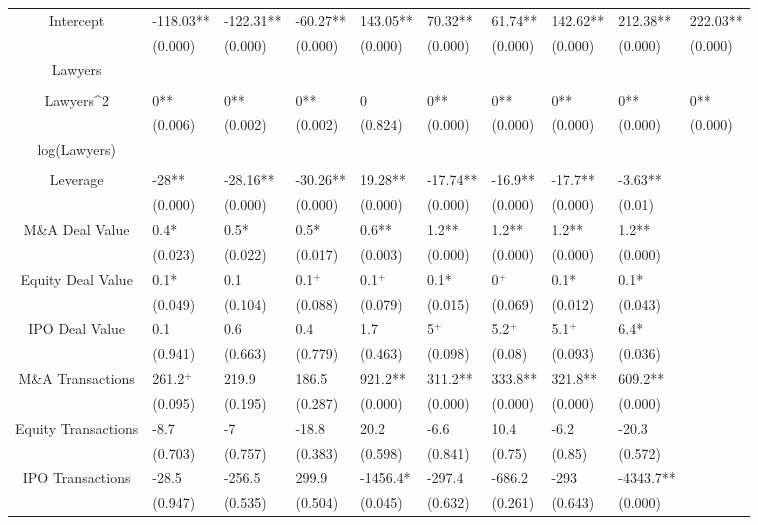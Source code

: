 \documentclass{article}
\begin{document}
\begin{table}[H]
\begin{tabular}{|clllllllll|}
Intercept & -118.03** & -122.31** & -60.27** & 143.05** & 70.32** & 61.74** & 142.62** & 212.38** & 222.03** \\
   & (0.000) & (0.000) & (0.000) & (0.000) & (0.000) & (0.000) & (0.000) & (0.000) & (0.000) \\
  Lawyers &  &  &  &  &  &  &  &  &  \\
   &  &  &  &  &  &  &  &  &  \\
  Lawyers^2 & 0** & 0** & 0** & 0 & 0** & 0** & 0** & 0** & 0** \\
   & (0.006) & (0.002) & (0.002) & (0.824) & (0.000) & (0.000) & (0.000) & (0.000) & (0.000) \\
  log(Lawyers) &  &  &  &  &  &  &  &  &  \\
   &  &  &  &  &  &  &  &  &  \\
  Leverage & -28** & -28.16** & -30.26** & 19.28** & -17.74** & -16.9** & -17.7** & -3.63** &  \\
   & (0.000) & (0.000) & (0.000) & (0.000) & (0.000) & (0.000) & (0.000) & (0.01) &  \\
  M\&A Deal Value & 0.4* & 0.5* & 0.5* & 0.6** & 1.2** & 1.2** & 1.2** & 1.2** &  \\
   & (0.023) & (0.022) & (0.017) & (0.003) & (0.000) & (0.000) & (0.000) & (0.000) &  \\
  Equity Deal Value & 0.1* & 0.1 & 0.1$^{+}$ & 0.1$^{+}$ & 0.1* & 0$^{+}$ & 0.1* & 0.1* &  \\
   & (0.049) & (0.104) & (0.088) & (0.079) & (0.015) & (0.069) & (0.012) & (0.043) &  \\
  IPO Deal Value & 0.1 & 0.6 & 0.4 & 1.7 & 5$^{+}$ & 5.2$^{+}$ & 5.1$^{+}$ & 6.4* &  \\
   & (0.941) & (0.663) & (0.779) & (0.463) & (0.098) & (0.08) & (0.093) & (0.036) &  \\
  M\&A Transactions & 261.2$^{+}$ & 219.9 & 186.5 & 921.2** & 311.2** & 333.8** & 321.8** & 609.2** &  \\
   & (0.095) & (0.195) & (0.287) & (0.000) & (0.000) & (0.000) & (0.000) & (0.000) &  \\
  Equity Transactions & -8.7 & -7 & -18.8 & 20.2 & -6.6 & 10.4 & -6.2 & -20.3 &  \\
   & (0.703) & (0.757) & (0.383) & (0.598) & (0.841) & (0.75) & (0.85) & (0.572) &  \\
  IPO Transactions & -28.5 & -256.5 & 299.9 & -1456.4* & -297.4 & -686.2 & -293 & -4343.7** &  \\
   & (0.947) & (0.535) & (0.504) & (0.045) & (0.632) & (0.261) & (0.643) & (0.000) &  \\

\end{tabular}
\end{table}
\end{document}
